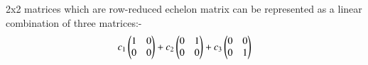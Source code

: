 
2x2 matrices which are row-reduced echelon matrix can be represented as a linear combination of three matrices:-\\
\begin{align}
 c_1\begin{pmatrix}1&0\\0&0\end{pmatrix}
  +c_2\begin{pmatrix}0&1\\0&0\end{pmatrix}+c_3\begin{pmatrix}0&0\\0&1\end{pmatrix}
\end{align}
